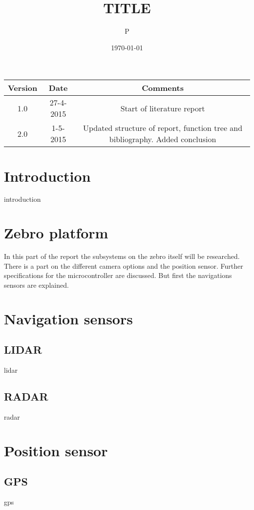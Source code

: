 \documentclass[parskip=full,11pt,a4paper,titlepage]{article}
\title{TITLE}
\author{P}
\date{\today}
\begin{document}



\clearpage

\begin{center}
\begin{tabular}{|c|c|c|}
\hline
	Version	& Date & Comments \\
\hline
	1.0		& 27-4-2015 & Start of literature report \\
\hline
	2.0		& 1-5-2015	& Updated structure of report, function tree and bibliography. Added conclusion \\
\hline
\end{tabular}
\end{center}
\clearpage



\tableofcontents
\clearpage

\section{Introduction}
{introduction}
\clearpage

\section{Zebro platform}

In this part of the report the subsystems on the zebro itself will be researched. There is a part on the different camera options and the position sensor. Further specifications for the microcontroller are discussed. But first the navigations sensors are explained.

\section{Navigation sensors}
\subsection{LIDAR}
{lidar}
\clearpage

\subsection{RADAR}
{radar}

\section{Position sensor}
\subsection{GPS}
{gps}
\clearpage
\end{document}
